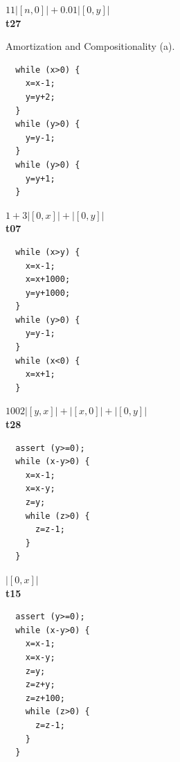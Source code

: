 \documentclass[nocopyrightspace,preprint,pldi]{sigplanconf-pldi15}
\begin{document}
{\begin{figure}[t!]
\begin{minipage}[b]{\progwidth}
\begin{center}
$11|[n,0]| + 0.01|[0,y]|$
\\[.7\baselineskip]
      {\bf t27}
    \end{center}
  \end{minipage}
   \caption{Amortization and Compositionality (a).}
  \label{fig:cat1a}
\end{figure}


\begin{figure}[t!]
 \setlength{\progwidth}{.24\linewidth}
  \centering

  \begin{minipage}[b]{\progwidth}
    \begin{center}
   \begin{lstlisting}
  while (x>0) {
    x=x-1;
    y=y+2;
  }
  while (y>0) {
    y=y-1;
  }
  while (y>0) {
    y=y+1;
  }
   \end{lstlisting}

$1 + 3|[0,x]| + |[0,y]|$
\\[.7\baselineskip]
      {\bf t07}
    \end{center}
  \end{minipage}%
%
%
%
  \begin{minipage}[b]{\progwidth}
    \begin{center}
   \begin{lstlisting}
  while (x>y) {
    x=x-1;
    x=x+1000;
    y=y+1000;
  }
  while (y>0) {
    y=y-1;
  }
  while (x<0) {
    x=x+1;
  }
   \end{lstlisting}

$1002|[y,x]|+|[x,0]|+|[0,y]|$
\\[.7\baselineskip]
      {\bf t28}
    \end{center}
  \end{minipage}%
%
%
  \begin{minipage}[b]{\progwidth}
    \begin{center}
   \begin{lstlisting}
  assert (y>=0);
  while (x-y>0) {
    x=x-1;
    x=x-y;
    z=y;
    while (z>0) {
      z=z-1;
    }
  }
   \end{lstlisting}

$|[0,x]|$
\\[.7\baselineskip]
      {\bf t15}
    \end{center}
  \end{minipage}
%
%
  \begin{minipage}[b]{\progwidth}
    \begin{center}
   \begin{lstlisting}
  assert (y>=0);
  while (x-y>0) {
    x=x-1;
    x=x-y;
    z=y;
    z=z+y;
    z=z+100;
    while (z>0) {
      z=z-1;
    }
  }
   \end{lstlisting}


\end{center}
\end{minipage}
\end{figure}}
\end{document}
